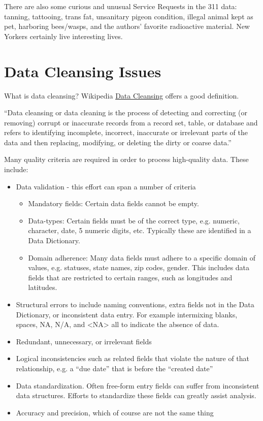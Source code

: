 \documentclass[12pt, titlepage]{article}
\begin{document}
There are also some curious and unusual Service Requests in the 311 data: 
tanning, tattooing, trans fat, unsanitary pigeon condition, illegal animal kept as pet, harboring bees/wasps, and the authors' favorite
radioactive material. New Yorkers certainly live interesting lives. 



\section{Data Cleansing Issues} \label{sec:issues}

What is data cleansing?  Wikipedia \href{https://en.wikipedia.org/wiki/Data_cleansing}{Data Cleansing} offers a good definition. 

``Data cleansing or data cleaning is the process of detecting and correcting (or removing) corrupt or inaccurate records from a record set, 
table, or database and refers to identifying incomplete, incorrect, inaccurate or irrelevant parts of the data 
and then replacing, modifying, or deleting the dirty or coarse data.''

Many quality criteria are required in order to process high-quality data. These include:

\begin{itemize}
	\item Data validation - this effort can span a number of criteria
	\begin{itemize}
		\item Mandatory fields: Certain data fields cannot be empty.
		\item Data-types: Certain fields must be of the correct type, e.g. numeric, character, date, 5 numeric digits, etc. Typically these are identified in a Data Dictionary.
		\item Domain adherence:  Many data fields must adhere to a specific domain of values, e.g. statuses, state names, zip codes, gender. This includes data
		fields that are restricted to certain ranges, such as longitudes and latitudes.
	\end{itemize}   
	\item Structural errors to include naming conventions, extra fields not in the Data Dictionary, or inconsistent data entry.
	For example intermixing blanks, spaces, NA, N/A, and \textless{}NA\textgreater{} all to indicate the absence of data.
	\item Redundant, unnecessary, or irrelevant fields
	\item Logical inconsistencies such as related fields that violate the nature of that relationship, e.g. a ``due date'' that is before the ``created date''
	\item Data standardization. Often free-form entry fields can suffer from inconsistent data structures. Efforts to standardize these fields can greatly assist analysis.
	\item Accuracy and precision, which of course are not the same thing 
\end{itemize}
\end{document}
